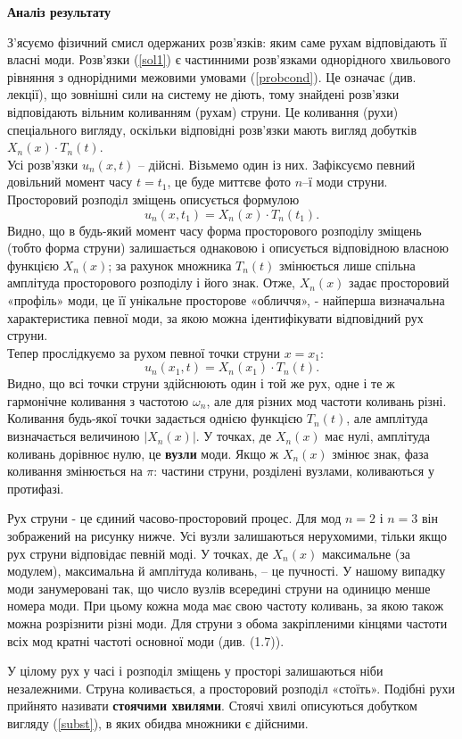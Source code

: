 \begin{center}
    \large{\textbf{Аналіз результату}}
\end{center}
З'ясуємо фізичний смисл одержаних розв'язків: яким саме рухам відповідають її власні моди. Розв’язки (\ref{sol1}) є частинними розв'язками однорідного хвильового рівняння з однорідними межовими умовами (\ref{probcond}). Це означає (див. лекції), що зовнішні сили на систему не діють, тому знайдені розв’язки відповідають вільним коливанням (рухам) струни. Це коливання (рухи) спеціального вигляду, оскільки відповідні розв’язки мають вигляд добутків $X_n(x) \cdot T_n(t)$.\\
Усі розв’язки $u_n(x, t)$ -- дійсні. Візьмемо один із них. Зафіксуємо певний довільний момент часу $t = t_1$, це буде миттєве фото $n$–ї моди струни. Просторовий розподіл зміщень описується формулою \[u_n(x, t_1) = X_n(x) \cdot T_n(t_1).\] Видно, що в будь-який момент часу форма просторового розподілу зміщень (тобто форма струни) залишається однаковою і описується відповідною власною функцією $X_n(x)$; за рахунок множника $T_n(t)$ змінюється лише спільна амплітуда просторового розподілу і його знак. Отже, $X_n(x)$ задає просторовий «профіль» моди, це її унікальне просторове «обличчя», - найперша визначальна характеристика певної моди, за якою можна ідентифікувати відповідний рух струни.\\
Тепер прослідкуємо за рухом певної точки струни $x = x_1$: \[u_n(x_1, t) = X_n(x_1) \cdot T_n(t).\] Видно, що всі точки струни здійснюють один і той же рух, одне і те ж гармонічне коливання з частотою $\omega_n$, але для різних мод частоти коливань різні. Коливання будь-якої точки задається однією функцією $T_n(t)$, але амплітуда визначається величиною $\left|X_n(x)\right|$. У точках, де $X_n(x)$ має нулі, амплітуда коливань дорівнює нулю, це \textbf{вузли} моди. Якщо ж $X_n(x)$ змінює знак, фаза коливання змінюється на $\pi$: частини струни, розділені вузлами, коливаються у протифазі.

Рух струни - це єдиний часово-просторовий процес. Для мод $n= 2$ і $n= 3$ він зображений на рисунку нижче. Усі вузли залишаються нерухомими, тільки якщо рух струни відповідає певній моді. У точках, де $X_n(x)$ максимальне (за модулем), максимальна й амплітуда коливань, -- це пучності. У нашому випадку моди занумеровані так, що число вузлів всередині струни на одиницю менше номера моди. При цьому кожна мода має свою частоту коливань, за якою також можна розрізнити різні моди. Для струни з обома закріпленими кінцями частоти всіх мод кратні частоті основної моди (див. (1.7)).
\begin{center}
    
\end{center}
У цілому рух у часі і розподіл зміщень у просторі залишаються ніби незалежними. Струна коливається, а просторовий розподіл «стоїть». Подібні рухи прийнято називати \textbf{стоячими хвилями}. Стоячі хвилі описуються добутком вигляду (\ref{subst}), в яких обидва множники є дійсними.